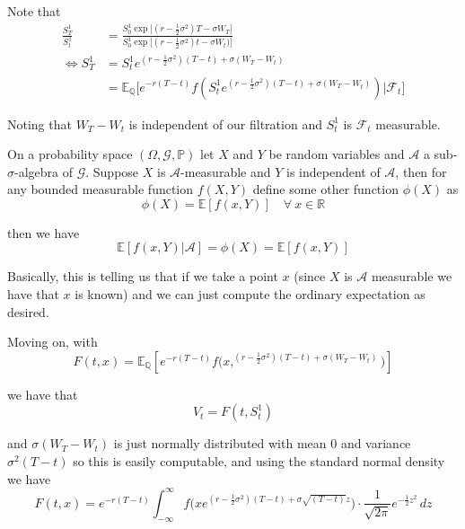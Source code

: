 \documentclass[12pt]{article}
\newenvironment{theorem}[2][Theorem:]{\begin{trivlist} %
\item[\hskip \labelsep {\bfseries #1}\hskip \labelsep {\bfseries #2.}]}{\end{trivlist}}
\begin{document}
Note that
\begin{align*}
	\frac{S^1_T}{S^1_t} &= \frac{S^1_0\exp{\big[(r - \frac{1}{2}\sigma^2)T - \sigma W_T}\big]}{{S^1_0\exp\big[(r - \frac{1}{2}\sigma^2)t - \sigma W_t)\big]}} \\
	\iff S^1_T &= S^1_t e^{(r - \frac{1}{2}\sigma^2)(T - t) + \sigma(W_T - W_t)} \\
	&= \mathbb E_{\mathbb Q}\Big[ e^{-r(T - t)}f(S^1_te^{(r - \frac{1}{2}\sigma^2)(T - t) + \sigma(W_T - W_t)}) \Big| \mathcal F_t\Big]
\end{align*}

Noting that $W_T - W_t$ is independent of our filtration and $S^1_t$ is $\mathcal F_t$ measurable.

\begin{theorem}{``FACT''} On a probability space $(\Omega,\mathcal G,\mathbb P)$ let $X$ and $Y$ be random variables and $\mathcal A$ a sub-$\sigma$-algebra of $\mathcal G$. Suppose $X$ is $\mathcal A$-measurable and $Y$ is independent of $\mathcal A$, then for any bounded measurable function $f(X,Y)$ define some other function $\phi(X)$ as
\begin{equation*}
	\phi(X) = \mathbb E[f(x,Y)] \quad \forall~x\in\mathbb R
\end{equation*}

then we have
\begin{equation*}
	\mathbb E[f(x,Y)|\mathcal A] = \phi(X) =  \mathbb E[f(x,Y)]
\end{equation*}

Basically, this is telling us that if we take a point $x$ (since $X$ is $\mathcal A$ measurable we have that $x$ is known) and we can just compute the ordinary expectation as desired.

\end{theorem}

Moving on, with 
\begin{equation*}
	F(t,x) = \mathbb E_{\mathbb Q}[e^{-r(T - t)}f\big(x,^{(r - \frac{1}{2}\sigma^2)(T - t) + \sigma(W_T - W_t)}\big)]
\end{equation*}

we have that 
\begin{equation*}
	V_t = F(t,S^1_t)
\end{equation*}

and $\sigma(W_T - W_t)$ is just normally distributed with mean 0 and variance $\sigma^2(T-t)$ so this is easily computable, and using the standard normal density we have
\begin{equation*}
	F(t,x) = e^{-r(T-t)}\int^\infty_{-\infty} f\big(xe^{(r - \frac{1}{2}\sigma^2)(T - t) + \sigma\sqrt{(T - t)}z}\big) \cdot \frac{1}{\sqrt{2\pi}}e^{-\frac{1}{2}z^2}\,dz
\end{equation*}
\end{document}
